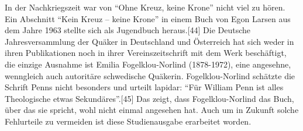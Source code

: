 \medskip

In der Nachkriegszeit war von "`Ohne Kreuz, keine Krone"' nicht viel zu hören.
Ein Abschnitt "`Kein Kreuz – keine Krone"' in einem Buch von Egon Larsen aus dem
Jahre 1963 stellte sich als Jugendbuch heraus.[44] Die Deutsche
Jahresversammlung der Quäker in Deutschland und Österreich hat sich weder in
ihren Publikationen noch in ihrer Vereinszeitschrift mit dem Werk beschäftigt,
die einzige Ausnahme ist Emilia Fogelklou-Norlind (1878-1972), eine angesehne,
wenngleich auch autoritäre schwedische Quäkerin. Fogelklou-Norlind schätzte die
Schrift Penns nicht besonders und urteilt lapidar: "`Für William Penn ist alles
Theologische etwas Sekundäres"'.[45]  Das zeigt, dass Fogelklou-Norlind das
Buch, über das sie spricht, wohl nicht einmal angesehen hat. Auch um in Zukunft
solche Fehlurteile zu vermeiden ist diese Studienausgabe erarbeitet worden.




